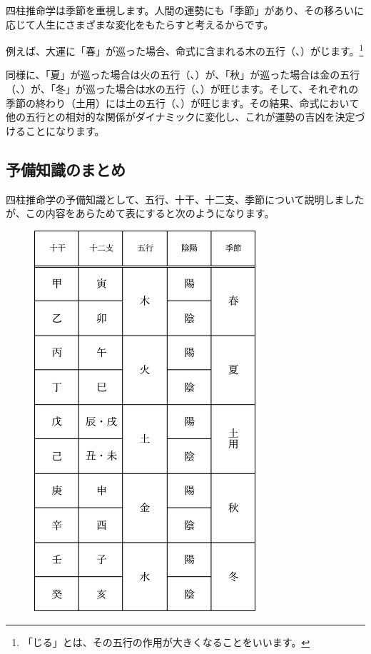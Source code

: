 \documentclass[a5paper,11pt,dvipdfmx]{tarticle}
\begin{document}
四柱推命学は季節を重視します。人間の運勢にも「季節」があり、その移ろいに応じて人生にさまざまな変化をもたらすと考えるからです。

例えば、大運に「春」が巡った場合、命式に含まれる木の五行（、）がじます。\footnote{「じる」とは、その五行の作用が大きくなることをいいます。}

同様に、「夏」が巡った場合は火の五行（、）が、「秋」が巡った場合は金の五行（、）が、「冬」が巡った場合は水の五行（、）が旺じます。そして、それぞれの季節の終わり（土用）には土の五行（、）が旺じます。その結果、命式において他の五行との相対的な関係がダイナミックに変化し、これが運勢の吉凶を決定づけることになります。


\subsection{予備知識のまとめ}

四柱推命学の予備知識として、五行、十干、十二支、季節について説明しましたが、この内容をあらためて表にすると次のようになります。

\begin{figure}[hbp]
  \centering
  \includegraphics[width=82mm,angle=90]{figs/table2-5.eps}
\end{figure}
\end{document}
